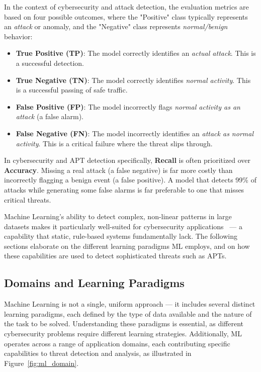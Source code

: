 In the context of cybersecurity and attack detection, the evaluation metrics are based on four possible outcomes, where the "Positive" class typically represents an \textit{attack} or anomaly, and the "Negative" class represents \textit{normal/benign} behavior:
\begin{itemize}
    \item \textbf{True Positive (TP)}: The model correctly identifies an \textit{actual attack}. This is a successful detection.
    \item \textbf{True Negative (TN)}: The model correctly identifies \textit{normal activity}. This is a successful passing of safe traffic.
    \item \textbf{False Positive (FP)}: The model incorrectly flags \textit{normal activity as an attack} (a false alarm).
    \item \textbf{False Negative (FN)}: The model incorrectly identifies an \textit{attack as normal activity}. This is a critical failure where the threat slips through.
\end{itemize}


In cybersecurity and APT detection specifically, \textbf{Recall} is often prioritized over \textbf{Accuracy}. Missing a real attack (a false negative) is far more costly than incorrectly flagging a benign event (a false positive). A model that detects 99\% of attacks while generating some false alarms is far preferable to one that misses critical threats.

Machine Learning's ability to detect complex, non-linear patterns in large datasets makes it particularly well-suited for cybersecurity applications~\cite{buczak2016survey} --- a capability that static, rule-based systems fundamentally lack. The following sections elaborate on the different learning paradigms ML employs, and on how these capabilities are used to detect sophisticated threats such as APTs.

\subsection{Domains and Learning Paradigms}

Machine Learning is not a single, uniform approach --- it includes several distinct learning paradigms, each defined by the type of data available and the nature of the task to be solved. Understanding these paradigms is essential, as different cybersecurity problems require different learning strategies. Additionally, ML operates across a range of application domains, each contributing specific capabilities to threat detection and analysis, as illustrated in Figure~\ref{fig:ml_domain}.

